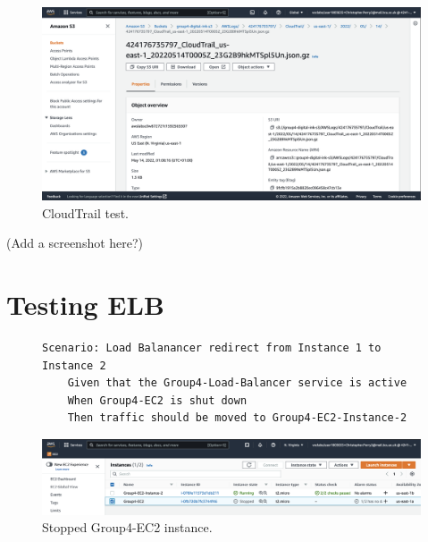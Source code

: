 \begin{figure}[!htbp]
    \centering
    \includegraphics[width=\textwidth]{resources/cloudtrail/cloudtrail-test}
    \caption{CloudTrail test.}
    \label{fig:cloudtrail-test-photo}
\end{figure}

(Add a screenshot here?)

\clearpage
\section{Testing ELB}\label{sec:testing-elb}

\begin{figure}[!htbp]
    \centering
    \begin{verbatim}
Scenario: Load Balanancer redirect from Instance 1 to Instance 2
    Given that the Group4-Load-Balancer service is active
    When Group4-EC2 is shut down
    Then traffic should be moved to Group4-EC2-Instance-2
    \end{verbatim}
    \label{fig:elb-test}
\end{figure}

\begin{figure}[!htbp]
    \centering
    \includegraphics[width=\textwidth]{resources/elb/elb-test-stopped-instance}
    \caption{Stopped Group4-EC2 instance.}
    \label{fig:elb-test-stopped-instance}
\end{figure}

